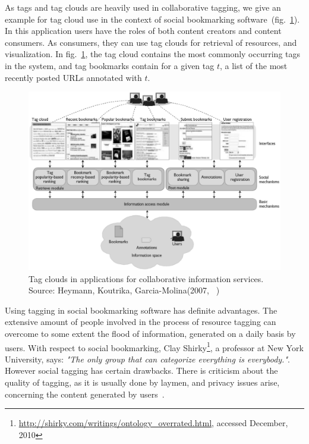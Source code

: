 As tags and tag clouds are heavily used in collaborative tagging, we give an example for tag cloud use in the context of social bookmarking software~(fig.~\ref{collaborativeTagging}). In this application users have the roles of both content creators and content consumers. As consumers, they can use tag clouds for retrieval of resources, and visualization. In fig.~\ref{collaborativeTagging}, the tag cloud contains the most commonly occurring tags in the system, and tag bookmarks contain for a given tag $t$, a list of the most recently posted URLs annotated with $t$.  \\  

\begin{figure}
	\centering
	\includegraphics[scale=0.6]{img/collaborativeTagging} 
	\caption[Tag clouds in collaborative information services]
           {Tag clouds in applications for collaborative information services. Source: Heymann, Koutrika, Garcia-Molina(2007, ~\cite{tagcloud_spam2007})}
\label{collaborativeTagging}
\end{figure}

Using tagging in social bookmarking software has definite advantages. The extensive amount of people involved in the process of resource tagging can overcome to some extent the flood of information, generated on a daily basis by users. With respect to social bookmarking, Clay Shirky\footnote{\url{http://shirky.com/writings/ontology_overrated.html}, accessed December, 2010}, a professor at New York University, says: \textit{"The only group that can categorize everything is everybody."}. However social tagging has certain drawbacks. There is criticism about the quality of tagging, as it is usually done by laymen, and privacy issues arise, concerning the content generated by users~\cite{folksonomiesWeb2.0_2009}. \\




